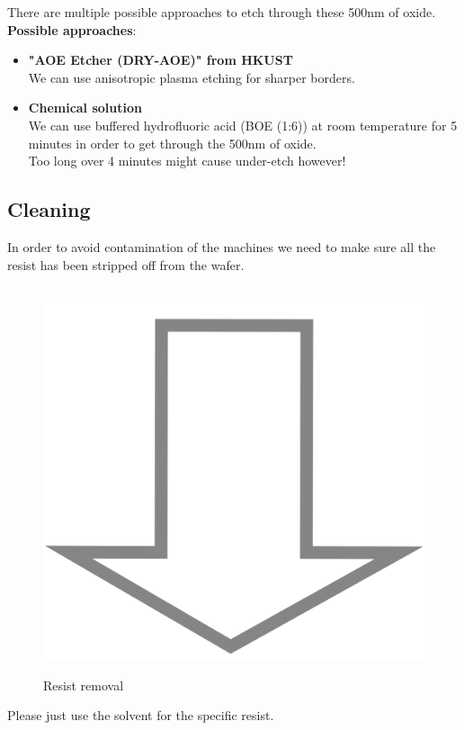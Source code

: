 There are multiple possible approaches to etch through these 500nm of oxide.\\

\textbf{Possible approaches}:
\begin{itemize}
	\item \textbf{"AOE Etcher (DRY-AOE)" from HKUST} \\
	We can use anisotropic plasma etching for sharper borders.
	\item \textbf{Chemical solution} \\
	We can use buffered hydrofluoric acid (BOE (1:6)) at room temperature for 5 minutes in order to get through the 500nm of oxide.\\
	Too long over 4 minutes might cause under-etch however!
\end{itemize}

\subsection{Cleaning}
In order to avoid contamination of the machines we need to make sure all the resist has been stripped off from the wafer.
\begin{figure}[H]
	\centering
	\begin{tikzpicture}[node distance = 3cm, auto, thick,scale=\CrossSectionOnly, every node/.style={transform shape}]
		
	\end{tikzpicture} \\
	\includegraphics[scale=0.01]{down_arrow.png} \\
	\begin{tikzpicture}[node distance = 3cm, auto, thick,scale=\CrossSectionOnly, every node/.style={transform shape}]
		
	\end{tikzpicture}
	\caption{Resist removal}
\end{figure}
Please just use the solvent for the specific resist.


